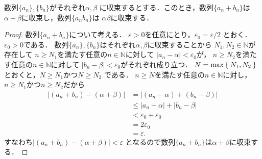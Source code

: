      \begin{thm} \label{thm:suretuconvwaseki}
       数列$\{ a_n \},  \{ b_n \}$がそれぞれ$\alpha ,  \beta$
       に収束するとする．このとき，数列$\{ a_n + b_n \}$は
       $\alpha + \beta$に収束し，数列$\{ a_n b_n \}$は
       $\alpha \beta$に収束する．
     \end{thm}
     \begin{proof}
       数列$\{ a_n + b_n \}$について考える．
       $\varepsilon >0$を任意にとり，$\varepsilon _0 = \varepsilon /2$
       とおく．$\varepsilon _0 >0$である．
       数列$\{ a_n \},  \{ b_n \}$はそれぞれ$\alpha ,  \beta$に収束することから
       $N_1 ,  N_2 \in \mathbb{N}$が存在して
       $n \geq N_1$を満たす任意の$n \in \mathbb{N}$に対して
       $\lvert a_n - \alpha \rvert < \varepsilon_0$が，
       $n \geq N_2$を満たす任意の$n \in \mathbb{N}$に対して
       $\lvert b_n - \beta \rvert < \varepsilon_0$がそれぞれ成り立つ．
       $N=\max \Set{ N_1 ,  N_2 }$とおくと，$N \geq N_1$かつ$N \geq N_2$
       である．
       $n \geq N$を満たす任意の$n \in \mathbb{N}$に対し，
       $n \geq N_1 $かつ$n \geq N_2$だから
       \begin{align*}
         \lvert (a_n + b_n ) - ( \alpha + \beta ) \rvert 
         & = \lvert (a_n - \alpha ) + (b_n - \beta ) \rvert \\
         & \leq \lvert a_n - \alpha \rvert + \lvert b_n - \beta \rvert \\
         & < \varepsilon _0 + \varepsilon _0 \\
         & = 2 \varepsilon _0 \\
         & = \varepsilon .
       \end{align*}
       すなわち$\lvert (a_n+b_n ) - ( \alpha + \beta ) \rvert < \varepsilon $
       となるので数列$\{ a_n + b_n \}$は$\alpha + \beta$に収束する．


\end{proof}
